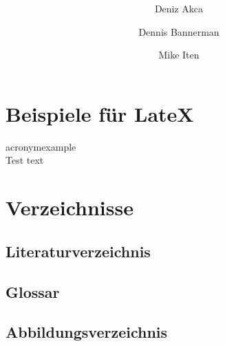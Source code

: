 \documentclass[a4paper]{article}
\author{
	Deniz Akca
	\and
	Dennis Bannerman
	\and
	Mike Iten
}
\affil{ZHAW - Zurich}
\title{
	\Huge{}\color{blue}\textbf{\project}\\ 
	\vspace{2cm}
	\large{}\color{black}\textbf{\outline}
}
\begin{document}
	\sloppy
	
	\begin{titlepage}
		\maketitle
		\thispagestyle{empty}
	\end{titlepage}
	
	\tableofcontents
	\newpage
	
	\fussy
	
	
	
	
	
	
	
	
	
	

	\section{Beispiele für LateX}
	\gls{acronymexample} \\
	\cite{Bibtex2021} Test text

	\section{Verzeichnisse}
	\subsection{Literaturverzeichnis}
	\subsection{Glossar}
	\subsection{Abbildungsverzeichnis}
	

	
		
	\newpage

	\printglossary[type=\acronymtype]
	\printglossary
	
	\newpage
	\printbibliography[heading=bibintoc]
	
	\newpage
		
\end{document}

